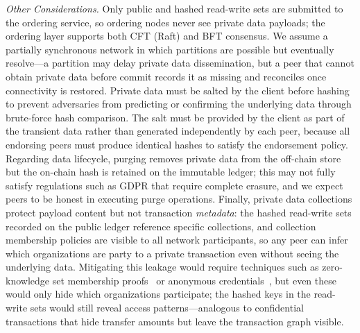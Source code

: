 \textit{Other Considerations.} Only public and hashed read-write sets are submitted to the ordering service, so ordering nodes never see private data payloads; the ordering layer supports both CFT (Raft) and BFT consensus. We assume a partially synchronous network in which partitions are possible but eventually resolve---a partition may delay private data dissemination, but a peer that cannot obtain private data before commit records it as missing and reconciles once connectivity is restored. Private data must be salted by the client before hashing to prevent adversaries from predicting or confirming the underlying data through brute-force hash comparison. The salt must be provided by the client as part of the transient data rather than generated independently by each peer, because all endorsing peers must produce identical hashes to satisfy the endorsement policy. Regarding data lifecycle, purging removes private data from the off-chain store but the on-chain hash is retained on the immutable ledger; this may not fully satisfy regulations such as GDPR that require complete erasure, and we expect peers to be honest in executing purge operations. Finally, private data collections protect payload content but not transaction \textit{metadata}: the hashed read-write sets recorded on the public ledger reference specific collections, and collection membership policies are visible to all network participants, so any peer can infer which organizations are party to a private transaction even without seeing the underlying data. Mitigating this leakage would require techniques such as zero-knowledge set membership proofs~\cite{zk-set-membership} or anonymous credentials~\cite{camenisch-lysyanskaya}, but even these would only hide which organizations participate; the hashed keys in the read-write sets would still reveal access patterns---analogous to confidential transactions that hide transfer amounts but leave the transaction graph visible.
